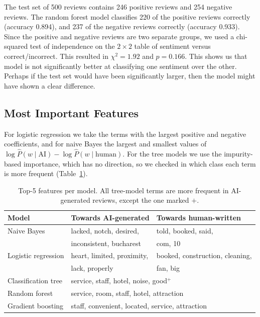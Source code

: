 \documentclass{article}
\begin{document}
The test set of 500 reviews contains 246 positive reviews and 254 negative reviews. The random forest model classifies 220 of the positive reviews correctly (accuracy 0.894), and 237 of the negative reviews correctly (accuracy 0.933). Since the positive and negative reviews are two separate groups, we used a chi-squared test of independence on the $2 \times 2$ table of sentiment versus correct/incorrect. This resulted in $\chi^2 = 1.92$ and $p = 0.166$. This shows us that model is not significantly better at classifying one sentiment over the other. Perhaps if the test set would have been significantly larger, then the model might have shown a clear difference. 

\subsection{Most Important Features}

For logistic regression we take the terms with the largest positive and
negative coefficients, and for naive Bayes the largest and smallest values of
$\log \hat{P}(w \mid \text{AI}) - \log \hat{P}(w \mid \text{human})$. For the
tree models we use the impurity-based importance, which has no direction, so we
checked in which class each term is more frequent (Table~\ref{tab:features}).

\begin{table}[H]
\centering
\small
\caption{Top-5 features per model. All tree-model terms are more frequent in
AI-generated reviews, except the one marked $+$.}
\label{tab:features}
\begin{tabular}{lll}
\hline
Model & Towards AI-generated & Towards human-written \\
\hline
Naive Bayes         & lacked, notch, desired,       & told, booked, said, \\
                    & inconsistent, bucharest       & com, 10 \\
Logistic regression & heart, limited, proximity,    & booked, construction, cleaning, \\
                    & lack, properly                & fan, big \\
\hline
Classification tree & \multicolumn{2}{l}{service, staff, hotel, noise, good$^+$} \\
Random forest       & \multicolumn{2}{l}{service, room, staff, hotel, attraction} \\
Gradient boosting   & \multicolumn{2}{l}{staff, convenient, located, service, attraction} \\
\hline
\end{tabular}
\end{table}
\end{document}
